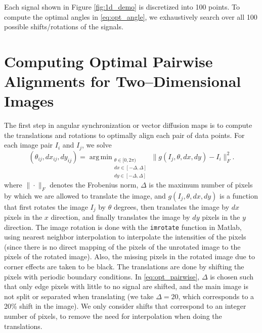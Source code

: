 \documentclass[11pt]{article}
\DeclareMathOperator*{\argmin}{arg\,min}
\begin{document}
Each signal shown in Figure \ref{fig:1d_demo} is discretized into 100 points. 
%
To compute the optimal angles in \eqref{eq:opt_angle}, we exhaustively search over all 100 possible shifts/rotations of the signals. 

\section{Computing Optimal Pairwise Alignments for Two--Dimensional Images}

The first step in angular synchronization or vector diffusion maps is to compute the translations and rotations to optimally align each pair of data points. 
%
For each image pair $I_i$ and $I_j$, we solve
\begin{equation}\label{eq:opt_pairwise}
(\theta_{ij}, dx_{ij}, dy_{ij}) = \argmin_{
\begin{matrix}
\theta \in [0, 2\pi) \\ 
dx \in [-\Delta, \Delta]\\ 
dy \in [-\Delta, \Delta]
\end{matrix}
} \|g(I_j, \theta, dx, dy) - I_i \|_F^2.
\end{equation}
where $\| \cdot \|_F$ denotes the Frobenius norm, $\Delta$ is the maximum number of pixels by which we are allowed to translate the image, and $g(I_j, \theta, dx, dy)$ is a function that first rotates the image $I_j$ by $\theta$ degrees, then translates the image by $dx$ pixels in the $x$ direction, and finally translates the image by $dy$ pixels in the $y$ direction. 
%
The image rotation is done with the \texttt{imrotate} function in Matlab, using nearest neighbor interpolation to interpolate the intensities of the pixels (since there is no direct mapping of the pixels of the unrotated image to the pixels of the rotated image).
%
Also, the missing pixels in the rotated image due to corner effects are taken to be black.
%
The translations are done by shifting the pixels with periodic boundary conditions.
%
In \eqref{eq:opt_pairwise}, $\Delta$ is chosen such that only edge pixels with little to no signal are shifted, and the main image is not split or separated when translating (we take $\Delta=20$, which corresponds to a 20\% shift in the image).
%
We only consider shifts that correspond to an integer number of pixels, to remove the need for interpolation when doing the translations.  
\end{document}
